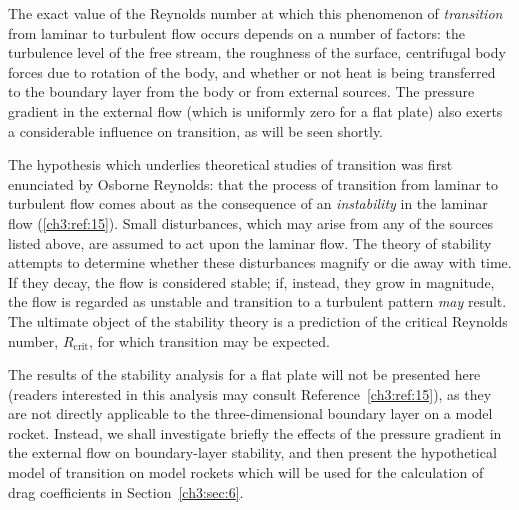 The exact value of the Reynolds number at which this
phenomenon of \emph{transition} from laminar to turbulent flow occurs
depends on a number of factors: the turbulence level of the
free stream, the roughness of the surface, centrifugal body
forces due to rotation of the body, and whether or not heat
is being transferred to the boundary layer from the body or
from external sources. The pressure gradient in the external
flow (which is uniformly zero for a flat plate) also exerts a
considerable influence on transition, as will be seen shortly.

The hypothesis which underlies theoretical studies of
transition was first enunciated by Osborne Reynolds: that
the process of transition from laminar to turbulent flow comes
about as the consequence of an \emph{instability} in the laminar flow
(\ref{ch3:ref:15}). Small disturbances, which may arise from any of the sources
listed above, are assumed to act upon the laminar flow. The
theory of stability attempts to determine whether these disturbances
magnify or die away with time. If they decay, the flow is
considered stable; if, instead, they grow in magnitude, the
flow is regarded as unstable and transition to a turbulent
pattern \emph{may} result. The ultimate object of the stability
theory is a prediction of the critical Reynolds number, $R_{\mathrm{crit}}$,
for which transition may be expected.

The results of the stability analysis for a flat plate
will not be presented here (readers interested in this analysis
may consult Reference~\ref{ch3:ref:15}), as they are not directly applicable
to the three-dimensional boundary layer on a model rocket.
Instead, we shall investigate briefly the effects of the pressure
gradient in the external flow on boundary-layer stability, and
then present the hypothetical model of transition on model
rockets which will be used for the calculation of drag coefficients
in Section~\ref{ch3:sec:6}.


